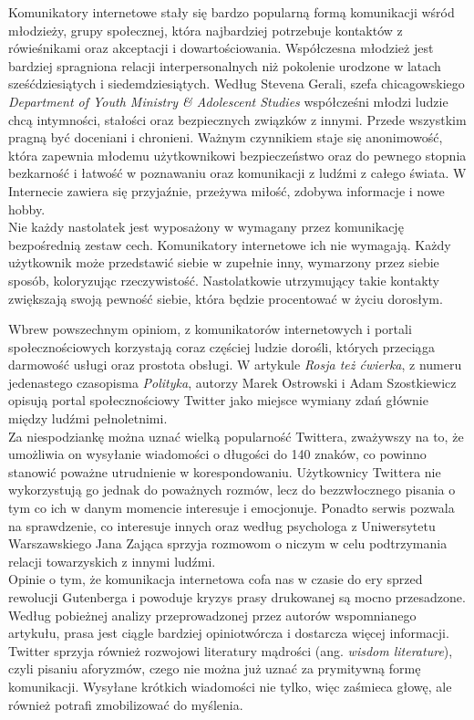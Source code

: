 \documentclass[a4paper,12pt]{article}
\begin{document}
\par Komunikatory internetowe stały się bardzo popularną formą komunikacji wśród młodzieży, grupy społecznej, która najbardziej potrzebuje kontaktów z rówieśnikami oraz akceptacji i dowartościowania. Współczesna młodzież jest bardziej spragniona relacji interpersonalnych niż pokolenie urodzone w latach sześćdziesiątych i siedemdziesiątych.
Według Stevena Gerali, szefa chicagowskiego \emph{Department of Youth Ministry \& Adolescent Studies} współcześni młodzi ludzie chcą intymności, stałości oraz bezpiecznych związków z innymi. Przede wszystkim pragną być doceniani i chronieni. Ważnym czynnikiem staje się anonimowość, która zapewnia młodemu użytkownikowi bezpieczeństwo oraz do pewnego stopnia bezkarność i łatwość w poznawaniu oraz komunikacji z ludźmi z całego świata.
W Internecie zawiera się przyjaźnie, przeżywa miłość, zdobywa informacje i nowe hobby.\\
Nie każdy nastolatek jest wyposażony w wymagany przez komunikację bezpośrednią zestaw cech. Komunikatory internetowe ich nie wymagają. Każdy użytkownik może przedstawić siebie w zupełnie inny, wymarzony przez siebie sposób, koloryzując rzeczywistość. Nastolatkowie utrzymujący takie kontakty zwiększają swoją pewność siebie, która będzie procentować w życiu dorosłym.

\par Wbrew powszechnym opiniom, z komunikatorów internetowych i portali społecznościowych korzystają coraz częściej ludzie dorośli, których przeciąga darmowość usługi oraz prostota obsługi. W artykule \emph{Rosja też ćwierka}, z numeru jedenastego czasopisma \emph{Polityka}, autorzy Marek Ostrowski i Adam Szostkiewicz opisują portal społecznościowy Twitter jako miejsce wymiany zdań głównie między ludźmi pełnoletnimi.\\
Za niespodziankę można uznać wielką popularność Twittera, zważywszy na to, że umożliwia on wysyłanie wiadomości o długości do 140 znaków, co powinno stanowić poważne utrudnienie w korespondowaniu. Użytkownicy Twittera nie wykorzystują go jednak do poważnych rozmów, lecz do bezzwłocznego pisania o tym co ich w danym momencie interesuje i emocjonuje. Ponadto serwis pozwala na sprawdzenie, co interesuje innych oraz według psychologa z Uniwersytetu Warszawskiego Jana Zająca sprzyja rozmowom o niczym w celu podtrzymania relacji towarzyskich z innymi ludźmi.\\
Opinie o tym, że komunikacja internetowa cofa nas w czasie do ery sprzed rewolucji Gutenberga i powoduje kryzys prasy drukowanej są mocno przesadzone. Według pobieżnej analizy przeprowadzonej przez autorów wspomnianego artykułu, prasa jest ciągle bardziej opiniotwórcza i dostarcza więcej informacji.\\
Twitter sprzyja również rozwojowi literatury mądrości (ang. \textit{wisdom literature}), czyli pisaniu aforyzmów, czego nie można już uznać za prymitywną formę komunikacji. Wysyłane krótkich wiadomości nie tylko, więc zaśmieca głowę, ale również potrafi zmobilizować do myślenia.
\end{document}
